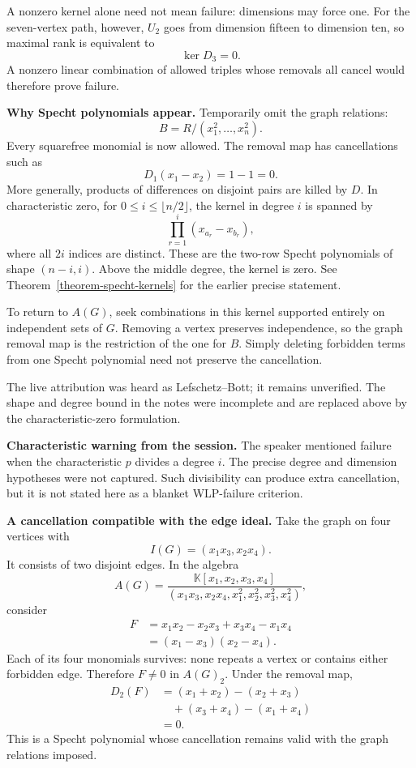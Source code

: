 A nonzero kernel alone need not mean
failure: dimensions may force one.
For the seven-vertex path, however,
$U_2$ goes from dimension fifteen
to dimension ten, so maximal rank is
equivalent to
$$
\ker D_3=0.
$$
A nonzero linear combination of allowed
triples whose removals all cancel
would therefore prove failure.

\medskip\noindent
\textbf{Why Specht polynomials appear.}
Temporarily omit the graph relations:
$$
B=R/(x_1^2,\ldots,x_n^2).
$$
Every squarefree monomial is now allowed.
The removal map has cancellations such as
$$
D_1(x_1-x_2)=1-1=0.
$$
More generally, products of differences
on disjoint pairs are killed by $D$.
In characteristic zero, for
$0\leq i\leq\lfloor n/2\rfloor$,
the kernel in degree $i$ is spanned by
$$
\prod_{r=1}^{i}(x_{a_r}-x_{b_r}),
$$
where all $2i$ indices are distinct.
These are the two-row Specht polynomials
of shape $(n-i,i)$.
Above the middle degree, the kernel is
zero. See
Theorem~\ref{theorem-specht-kernels}
for the earlier precise statement.

To return to $A(G)$, seek combinations
in this kernel supported entirely on
independent sets of $G$.
Removing a vertex preserves independence,
so the graph removal map is the
restriction of the one for $B$.
Simply deleting forbidden terms from
one Specht polynomial need not preserve
the cancellation.

The live attribution was heard as
Lefschetz--Bott; it remains unverified.
The shape and degree bound in the notes
were incomplete and are replaced above
by the characteristic-zero formulation.

\medskip\noindent
\textbf{Characteristic warning from
the session.}
The speaker mentioned failure when the
characteristic $p$ divides a degree $i$.
The precise degree and dimension
hypotheses were not captured.
Such divisibility can produce extra
cancellation, but it is not stated
here as a blanket WLP-failure criterion.

\medskip\noindent
\textbf{A cancellation compatible with
the edge ideal.}
Take the graph on four vertices with
$$
I(G)=(x_1x_3,x_2x_4).
$$
It consists of two disjoint edges.
In the algebra
$$
A(G)=
\frac{\mathbb K[x_1,x_2,x_3,x_4]}
{(x_1x_3,x_2x_4,x_1^2,x_2^2,x_3^2,x_4^2)},
$$
consider
$$
\begin{aligned}
F&=x_1x_2-x_2x_3+x_3x_4-x_1x_4\\
 &=(x_1-x_3)(x_2-x_4).
\end{aligned}
$$
Each of its four monomials survives:
none repeats a vertex or contains
either forbidden edge.
Therefore $F\ne0$ in $A(G)_2$.
Under the removal map,
$$
\begin{aligned}
D_2(F)&=(x_1+x_2)-(x_2+x_3)\\
&\quad +(x_3+x_4)-(x_1+x_4)\\
&=0.
\end{aligned}
$$
This is a Specht polynomial whose
cancellation remains valid with the
graph relations imposed.

